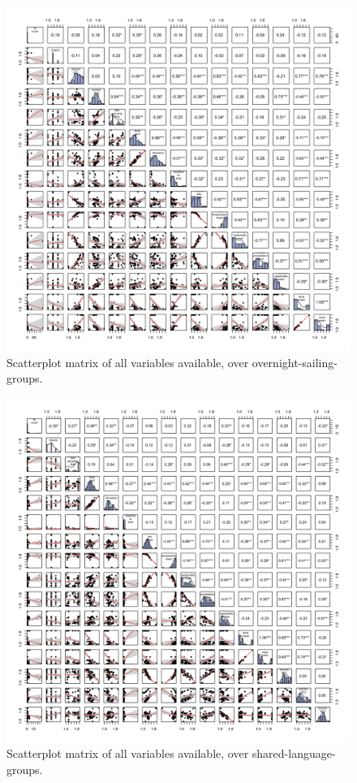 \documentclass[a4paper,10pt]{article} %
\begin{document}
\begin{figure}[ht]
\includegraphics[width=15cm]{latex/SPLOM_SBZR_all_variables.png}
\caption{Scatterplot matrix of all variables available, over overnight-sailing-groups.}
\label{SPLOM_SBZR_all_variables}
\end{figure}

\begin{figure}[ht]
\includegraphics[width=15cm]{latex/SPLOM_medium_all_variables.png}
\caption{Scatterplot matrix of all variables available, over shared-language-groups.}
\label{SPLOM_medium_all_variables}
\end{figure}
\end{document}
